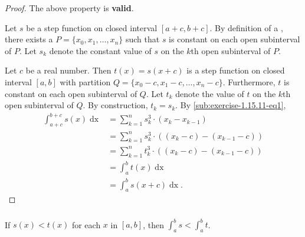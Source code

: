 \documentclass{report}
\begin{document}
\begin{proof}

  The above property is \textbf{valid}.

  \vspace{6pt}

  Let $s$ be a step function on closed interval $[a + c, b + c]$.
  By definition of a , there exists a
     $P = \{x_0, x_1, \ldots, x_n\}$ such that $s$ is
    constant on each open subinterval of $P$.
  Let $s_k$ denote the constant value of $s$ on the $k$th open subinterval of
    $P$.

  Let $c$ be a real number.
  Then $t(x) = s(x + c)$ is a step function on closed interval $[a, b]$ with
    partition $Q = \{x_0 - c, x_1 - c, \ldots, x_n - c\}$.
  Furthermore, $t$ is constant on each open subinterval of $Q$.
  Let $t_k$ denote the value of $t$ on the $k$th open subinterval of $Q$.
  By construction, $t_k = s_k$.
  By \eqref{sub:exercise-1.15.11-eq1},
    \begin{align*}
      \int_{a+c}^{b+c} s(x) \mathop{dx}
        & = \sum_{k=1}^n s_k^3 \cdot (x_k - x_{k-1}) \\
        & = \sum_{k=1}^n s_k^3 \cdot ((x_k - c) - (x_{k-1} - c)) \\
        & = \sum_{k=1}^n t_k^3 \cdot ((x_k - c) - (x_{k-1} - c)) \\
        & = \int_a^b t(x) \mathop{dx} \\
        & = \int_a^b s(x + c) \mathop{dx}.
    \end{align*}

\end{proof}

\subsubsection{}%
\label{ssub:exercise-1.15.11e}

If $s(x) < t(x)$ for each $x$ in $[a, b]$, then $\int_a^b s < \int_a^b t$.

\end{document}
